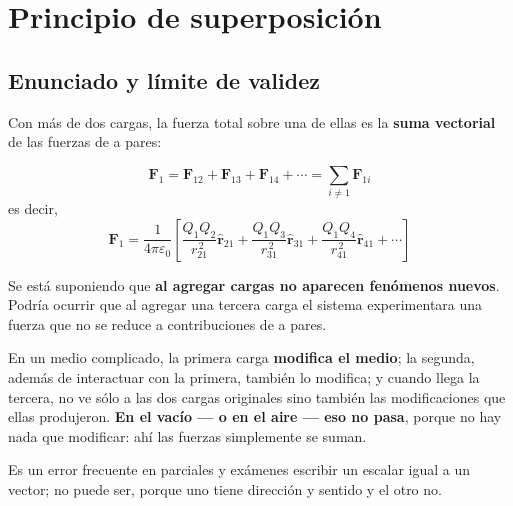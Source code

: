 \documentclass[12pt,a4paper]{article}
\begin{document}
\section{Principio de superposición}

\subsection{Enunciado y límite de validez}

Con más de dos cargas, la fuerza total sobre una de ellas es la \textbf{suma
vectorial} de las fuerzas de a pares:

\begin{keybox}
\[
\boxed{\ \mathbf{F}_1 = \mathbf{F}_{12} + \mathbf{F}_{13} + \mathbf{F}_{14}
       + \cdots = \sum_{i \neq 1} \mathbf{F}_{1i}\ }
\]
es decir,
\[
\mathbf{F}_1 = \frac{1}{4\pi\varepsilon_0}\left[
\frac{Q_1 Q_2}{r_{21}^{\,2}}\hat{\mathbf{r}}_{21}
+ \frac{Q_1 Q_3}{r_{31}^{\,2}}\hat{\mathbf{r}}_{31}
+ \frac{Q_1 Q_4}{r_{41}^{\,2}}\hat{\mathbf{r}}_{41} + \cdots \right]
\]
\end{keybox}

\begin{warnbox}
Se está suponiendo que \textbf{al agregar cargas no aparecen fenómenos nuevos}.
Podría ocurrir que al agregar una tercera carga el sistema experimentara una
fuerza que no se reduce a contribuciones de a pares.
\end{warnbox}

\begin{notebox}
En un medio complicado, la primera carga \textbf{modifica el medio}; la segunda,
además de interactuar con la primera, también lo modifica; y cuando llega la
tercera, no ve sólo a las dos cargas originales sino también las modificaciones
que ellas produjeron. \textbf{En el vacío --- o en el aire --- eso no pasa},
porque no hay nada que modificar: ahí las fuerzas simplemente se suman.
\end{notebox}

\begin{warnbox}
Es un error frecuente en parciales y exámenes escribir un escalar igual a un
vector; no puede ser, porque uno tiene dirección y sentido y el otro no.
\end{warnbox}
\end{document}
